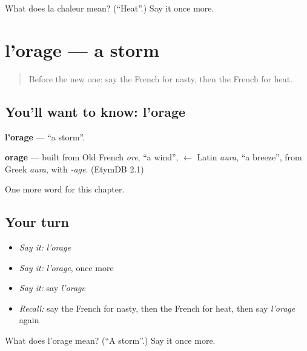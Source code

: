 \begin{tcolorbox}[breakable,colback=teal!4,colframe=teal!35!black,title={Before you move on}]
What does la chaleur mean? (\textquotedblleft{}Heat\textquotedblright{}.) Say it once more.
\end{tcolorbox}
\section[l'orage]{l'orage — a storm}

\label{lesson:FR-C133-orage}



\begin{quote}
Before the new one: say the French for nasty, then the French for heat.
\end{quote}

\subsection*{You'll want to know: l'orage}
\textbf{l'orage} — \textquotedblleft{}a storm\textquotedblright{}.

\begin{cousinweb}
\textbf{orage} — built from Old French \emph{ore}, \textquotedblleft{}a wind\textquotedblright{}, $\leftarrow$ Latin \emph{aura}, \textquotedblleft{}a breeze\textquotedblright{}, from Greek \emph{aura}, with \emph{-age}. (EtymDB 2.1)
\end{cousinweb}

\begin{grammarlens}[title={What you've built}]
One more word for this chapter.
\end{grammarlens}

\subsection*{Your turn}
\begin{itemize}
\raggedright
  \item \emph{Say it:} \emph{l'orage}
  \item \emph{Say it:} \emph{l'orage}, once more
  \item \emph{Say it:} say \emph{l'orage}
  \item \emph{Recall:} say the French for nasty, then the French for heat, then say \emph{l'orage} again
\end{itemize}

\begin{tcolorbox}[breakable,colback=teal!4,colframe=teal!35!black,title={Before you move on}]
What does l'orage mean? (\textquotedblleft{}A storm\textquotedblright{}.) Say it once more.
\end{tcolorbox}
